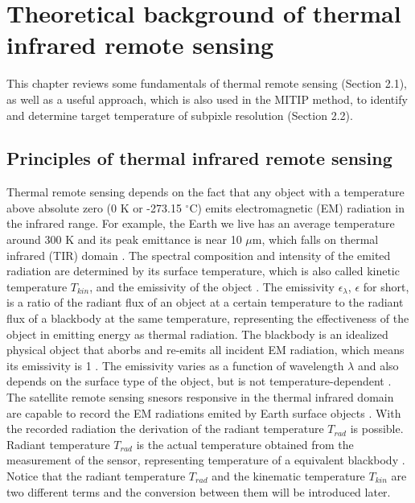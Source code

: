 \chapter{Theoretical background of thermal infrared remote sensing}

\label{Chapter2}

This chapter reviews some fundamentals of thermal remote sensing (Section 2.1), as well as a useful approach, which is also used in the MITIP method, to identify and determine target temperature of subpixle resolution (Section 2.2). \\


\section{Principles of thermal infrared remote sensing}
Thermal remote sensing depends on the fact that any object with a temperature above absolute zero (0 K or -273.15 $^\circ$C) emits electromagnetic (EM) radiation in the infrared range. For example, the Earth we live has an average temperature around 300 K and its peak emittance is near 10 $\mu$m, which falls on thermal infrared (TIR) domain \parencite {Reference201, Reference202}. The spectral composition and intensity of the emited radiation are determined by its surface temperature, which is also called kinetic temperature $T_{kin}$,  and the emissivity of the object \parencite{Reference207}. The emissivity $\epsilon_{\lambda}$, $\epsilon$ for short, is a ratio of the radiant flux of an object at a certain temperature to the radiant flux of a blackbody at the same temperature, representing the effectiveness of the object in emitting energy as thermal radiation. The blackbody is an idealized physical object that aborbs and re-emits all incident EM radiation, which means its emissivity is 1 \parencite{Reference206, Reference204}. The emissivity varies as a function of wavelength $\lambda$ and also depends on the surface type of the object, but is not temperature-dependent \parencite{Reference203}.\\

\noindent The satellite remote sensing snesors responsive in the thermal infrared domain are capable to record the EM radiations emited by Earth surface objects \parencite{Reference204}. With the recorded radiation the derivation of the radiant temperature $T_{rad}$ is possible. Radiant temperature $T_{rad}$ is the actual temperature obtained from the measurement of the sensor, representing temperature of a equivalent blackbody \parencite{Reference206}. Notice that the radiant temperature $T_{rad}$ and the kinematic temperature $T_{kin}$ are two different terms and the conversion between them will be introduced later.\\

